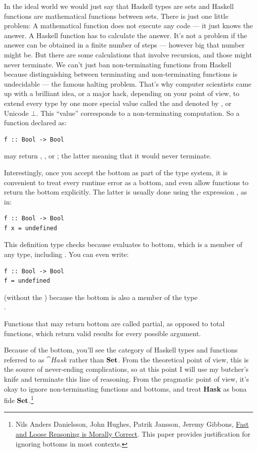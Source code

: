 In the ideal world we would just say that Haskell types are sets and
Haskell functions are mathematical functions between sets. There is just
one little problem: A mathematical function does not execute any code
--- it just knows the answer. A Haskell function has to calculate the
answer. It's not a problem if the answer can be obtained in a finite
number of steps --- however big that number might be. But there are some
calculations that involve recursion, and those might never terminate. We
can't just ban non-terminating functions from Haskell because
distinguishing between terminating and non-terminating functions is
undecidable --- the famous halting problem. That's why computer
scientists came up with a brilliant idea, or a major hack, depending on
your point of view, to extend every type by one more special value
called the  and denoted by \code{\_|\_}, or
Unicode $\bot$. This ``value'' corresponds to a non-terminating computation.
So a function declared as:

\begin{Verbatim}
f :: Bool -> Bool
\end{Verbatim}
may return , , or \code{\_|\_};
the latter meaning that it would never terminate.

Interestingly, once you accept the bottom as part of the type system, it
is convenient to treat every runtime error as a bottom, and even allow
functions to return the bottom explicitly. The latter is usually done
using the expression , as in:

\begin{Verbatim}
f :: Bool -> Bool
f x = undefined
\end{Verbatim}
This definition type checks because  evaluates to
bottom, which is a member of any type, including . You can
even write:

\begin{Verbatim}
f :: Bool -> Bool
f = undefined
\end{Verbatim}
(without the ) because the bottom is also a member of the type\\
.

Functions that may return bottom are called partial, as opposed to total
functions, which return valid results for every possible argument.

Because of the bottom, you'll see the category of Haskell types and
functions referred to as $\cat{Hask}$ rather than $\mathbf{Set}$. From
the theoretical point of view, this is the source of never-ending
complications, so at this point I will use my butcher's knife and
terminate this line of reasoning. From the pragmatic point of view, it's
okay to ignore non-terminating functions and bottoms, and treat
\textbf{Hask} as bona fide $\mathbf{Set}$.\footnote{Nils Anders Danielsson,
John Hughes, Patrik Jansson, Jeremy Gibbons, \href{http://www.cs.ox.ac.uk/jeremy.gibbons/publications/fast+loose.pdf}{
Fast and Loose Reasoning is Morally Correct}. This paper provides justification for ignoring bottoms in most contexts.}

